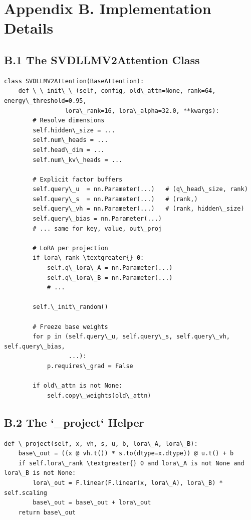 
\section{Appendix B. Implementation Details}

\subsection{B.1 The SVDLLMV2Attention Class}

\begin{lstlisting}
class SVDLLMV2Attention(BaseAttention):
    def \_\_init\_\_(self, config, old\_attn=None, rank=64, energy\_threshold=0.95,
                 lora\_rank=16, lora\_alpha=32.0, **kwargs):
        # Resolve dimensions
        self.hidden\_size = ...
        self.num\_heads = ...
        self.head\_dim = ...
        self.num\_kv\_heads = ...
        
        # Explicit factor buffers
        self.query\_u  = nn.Parameter(...)   # (q\_head\_size, rank)
        self.query\_s  = nn.Parameter(...)   # (rank,)
        self.query\_vh = nn.Parameter(...)   # (rank, hidden\_size)
        self.query\_bias = nn.Parameter(...)
        # ... same for key, value, out\_proj
        
        # LoRA per projection
        if lora\_rank \textgreater{} 0:
            self.q\_lora\_A = nn.Parameter(...)
            self.q\_lora\_B = nn.Parameter(...)
            # ...
        
        self.\_init\_random()
        
        # Freeze base weights
        for p in (self.query\_u, self.query\_s, self.query\_vh, self.query\_bias,
                  ...):
            p.requires\_grad = False
        
        if old\_attn is not None:
            self.copy\_weights(old\_attn)
\end{lstlisting}

\subsection{B.2 The `\_project` Helper}

\begin{lstlisting}
def \_project(self, x, vh, s, u, b, lora\_A, lora\_B):
    base\_out = ((x @ vh.t()) * s.to(dtype=x.dtype)) @ u.t() + b
    if self.lora\_rank \textgreater{} 0 and lora\_A is not None and lora\_B is not None:
        lora\_out = F.linear(F.linear(x, lora\_A), lora\_B) * self.scaling
        base\_out = base\_out + lora\_out
    return base\_out
\end{lstlisting}

